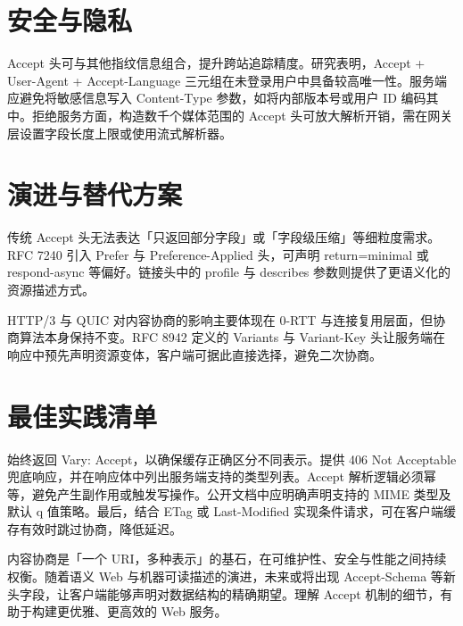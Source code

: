 \chapter{安全与隐私}
Accept 头可与其他指纹信息组合，提升跨站追踪精度。研究表明，Accept + User-Agent + Accept-Language 三元组在未登录用户中具备较高唯一性。服务端应避免将敏感信息写入 Content-Type 参数，如将内部版本号或用户 ID 编码其中。拒绝服务方面，构造数千个媒体范围的 Accept 头可放大解析开销，需在网关层设置字段长度上限或使用流式解析器。\par
\chapter{演进与替代方案}
传统 Accept 头无法表达「只返回部分字段」或「字段级压缩」等细粒度需求。RFC 7240 引入 Prefer 与 Preference-Applied 头，可声明 return=minimal 或 respond-async 等偏好。链接头中的 profile 与 describes 参数则提供了更语义化的资源描述方式。\par
HTTP/3 与 QUIC 对内容协商的影响主要体现在 0-RTT 与连接复用层面，但协商算法本身保持不变。RFC 8942 定义的 Variants 与 Variant-Key 头让服务端在响应中预先声明资源变体，客户端可据此直接选择，避免二次协商。\par
\chapter{最佳实践清单}
始终返回 Vary: Accept，以确保缓存正确区分不同表示。提供 406 Not Acceptable 兜底响应，并在响应体中列出服务端支持的类型列表。Accept 解析逻辑必须幂等，避免产生副作用或触发写操作。公开文档中应明确声明支持的 MIME 类型及默认 q 值策略。最后，结合 ETag 或 Last-Modified 实现条件请求，可在客户端缓存有效时跳过协商，降低延迟。\par
内容协商是「一个 URI，多种表示」的基石，在可维护性、安全与性能之间持续权衡。随着语义 Web 与机器可读描述的演进，未来或将出现 Accept-Schema 等新头字段，让客户端能够声明对数据结构的精确期望。理解 Accept 机制的细节，有助于构建更优雅、更高效的 Web 服务。\par
